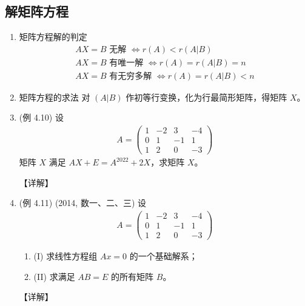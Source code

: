 \documentclass[12pt, a4paper, oneside, UTF8]{ctexbook}
\begin{document}
\subsection{解矩阵方程}

\begin{enumerate}[label=\arabic*.,start=9]
    \item 矩阵方程解的判定
    \begin{align*}
    AX = B \text{ 无解 } \Leftrightarrow r(A) < r(A|B) \\
    AX = B \text{ 有唯一解 } \Leftrightarrow r(A) = r(A|B) = n \\
    AX = B \text{ 有无穷多解 } \Leftrightarrow r(A) = r(A|B) < n
    \end{align*}
    
    \item 矩阵方程的求法
    对 $(A|B)$ 作初等行变换，化为行最简形矩阵，得矩阵 $X$。
    
    \item (例 4.10) 设 
    \begin{align*}
    A = \begin{pmatrix}
    1 & -2 & 3 & -4 \\
    0 & 1 & -1 & 1 \\
    1 & 2 & 0 & -3
    \end{pmatrix}
    \end{align*}
    矩阵 $X$ 满足 $AX + E = A^{2022} + 2X$，求矩阵 $X$。
    
    \begin{solution}
    【详解】
    \end{solution}
    
    \item (例 4.11) (2014, 数一、二、三) 设 
    \begin{align*}
    A = \begin{pmatrix}
    1 & -2 & 3 & -4 \\
    0 & 1 & -1 & 1 \\
    1 & 2 & 0 & -3
    \end{pmatrix}
    \end{align*}
    \begin{enumerate}
        \item (I) 求线性方程组 $Ax = 0$ 的一个基础解系；
        \item (II) 求满足 $AB = E$ 的所有矩阵 $B$。
    \end{enumerate}
    
    \begin{solution}
    【详解】
    \end{solution}
\end{enumerate}
\end{document}
